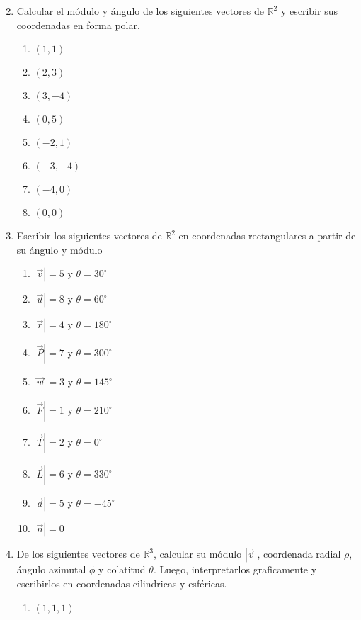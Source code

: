 \documentclass[a4paper]{article}
\newcommand{\exercise}{\item}
\newcommand{\degs}{^{\circ}}
\begin{document}
\begin{enumerate}
\begin{multicols}{2}
	\end{multicols}
	\exercise Calcular el módulo y ángulo de los siguientes vectores de $\mathbb{R}^2$ y escribir sus coordenadas en forma polar.
	\begin{multicols}{2}
	\begin{enumerate} [label=(\alph*)]
		\item $(1,1)$
		\item $(2,3)$
		\item $(3,-4)$
		\item $(0,5)$
		\item $(-2,1)$
		\item $(-3,-4)$
		\item $(-4,0)$
		\item $(0,0)$
	\end{enumerate}
	\end{multicols}
	\exercise Escribir los siguientes vectores de $\mathbb{R}^2$ en coordenadas rectangulares a partir de su ángulo y módulo
	\begin{multicols}{2}
	\begin{enumerate} [label=(\alph*)]
		\item $\left|\vec{v}\right|=5$ y $\theta=30\degs$
		\item $\left|\vec{u}\right|=8$ y $\theta=60\degs$
		\item $\left|\vec{r}\right|=4$ y $\theta=180\degs$
		\item $\left|\vec{P}\right|=7$ y $\theta=300\degs$
		\item $\left|\vec{w}\right|=3$ y $\theta=145\degs$
		\item $\left|\vec{F}\right|=1$ y $\theta=210\degs$
		\item $\left|\vec{T}\right|=2$ y $\theta=0\degs$
		\item $\left|\vec{L}\right|=6$ y $\theta=330\degs$
		\item $\left|\vec{a}\right|=5$ y $\theta=-45\degs$
		\item $\left|\vec{n}\right|=0$
	\end{enumerate}
	\end{multicols}
	\exercise De los siguientes vectores de $\mathbb{R}^3$, calcular su módulo $|\vec{v}|$, coordenada radial $\rho$, ángulo azimutal $\phi$ y colatitud $\theta$. Luego, interpretarlos graficamente y escribirlos en coordenadas cilindricas y esféricas.
	\begin{multicols}{2}
	\begin{enumerate} [label=(\alph*)]
		\item $(1,1,1)$

\end{enumerate}
\end{multicols}
\end{enumerate}
\end{document}

